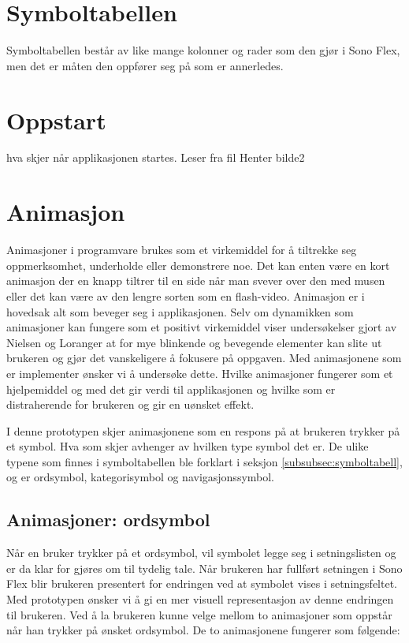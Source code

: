 \section{Symboltabellen}

Symboltabellen består av like mange kolonner og rader som den gjør i Sono Flex,  men det er måten den oppfører seg på som er annerledes.  



\section{Oppstart}
hva skjer når applikasjonen startes.
Leser fra fil
Henter bilde2




\section{Animasjon}

Animasjoner i programvare brukes som et virkemiddel for å tiltrekke seg oppmerksomhet, underholde eller demonstrere noe. Det kan enten være en kort animasjon der en knapp tiltrer til en side når man svever over den med musen eller det kan være av den lengre sorten som en flash-video.  Animasjon er i hovedsak alt som beveger seg i applikasjonen. Selv om dynamikken som animasjoner kan fungere som et positivt virkemiddel viser undersøkelser gjort av Nielsen og Loranger \cite{NielsenBok}  at for mye blinkende og bevegende elementer kan slite ut brukeren og gjør det vanskeligere å fokusere på oppgaven. Med animasjonene som er implementer ønsker vi å undersøke dette. Hvilke animasjoner fungerer som et hjelpemiddel og med det gir verdi til applikasjonen og hvilke som er distraherende for brukeren og gir en uønsket effekt.

I denne prototypen skjer animasjonene som en respons på at brukeren trykker på et symbol. Hva som skjer avhenger av hvilken type symbol det er. De ulike typene som finnes i symboltabellen ble forklart i seksjon \ref{subsubsec:symboltabell}, og er ordsymbol, kategorisymbol og navigasjonssymbol.


\subsection{Animasjoner: ordsymbol}

Når en bruker trykker på et ordsymbol, vil symbolet legge seg i setningslisten og er da klar for gjøres om til tydelig tale. Når brukeren har fullført setningen i Sono Flex blir brukeren presentert for endringen ved at symbolet vises i setningsfeltet. Med prototypen ønsker vi  å gi en mer visuell representasjon av denne endringen til brukeren. Ved å la brukeren kunne velge mellom to animasjoner som oppstår når han trykker på ønsket ordsymbol. De to animasjonene fungerer som følgende:


